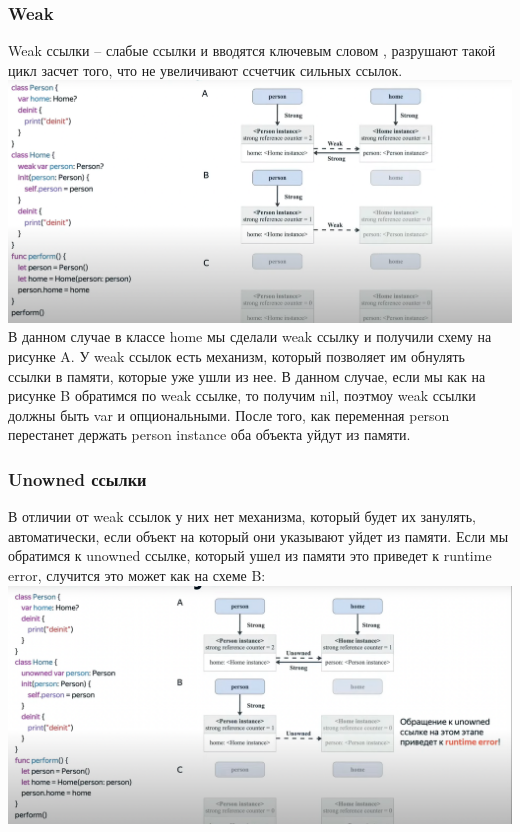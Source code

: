 \documentclass{article}
\begin{document}
    \subsubsection{Weak}
    Weak ссылки -- слабые ссылки и вводятся ключевым словом , разрушают такой цикл засчет того, что не увеличивают ссчетчик сильных ссылок. 
    \newline
    \includegraphics[scale = 0.2]{pic/weakCycleAdvSwift.png}
    \newline
    В данном случае в классе home мы сделали weak ссылку и получили схему на рисунке A. У weak ссылок есть механизм, который позволяет им обнулять ссылки в памяти, которые уже ушли из нее. 
    \newline
    В данном случае, если мы как на рисунке B обратимся по weak ссылке, то получим nil, поэтмоу weak ссылки должны быть var и опциональными. 
    \newline
    После того, как переменная person перестанет держать person instance оба объекта уйдут из памяти. 
    \newline
    \subsubsection{Unowned ссылки}
    В отличии от weak ссылок у них нет механизма, который будет их занулять, автоматически, если объект на который они указывают уйдет из памяти. 
    \newline
    Если мы обратимся к unowned ссылке, который ушел из памяти это приведет к runtime error, случится это может как на схеме B: 
    \newline
    \includegraphics[scale = 0.2]{pic/unownedSwfitAdv.png}
\end{document}
